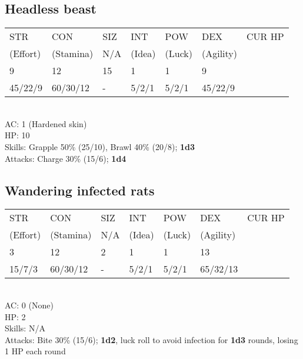 \documentclass[12pt,a4paper]{article}
\begin{document}
\subsection*{Headless beast}
\begin{tabular}{| l | l | l | l | l | l |l|}
\hline
STR & CON & SIZ & INT & POW & DEX & CUR HP\\
(Effort) & (Stamina) & N/A & (Idea) & (Luck) & (Agility) & \\
\hline
9       & 12       & 15 & 1     & 1     & 9       & \\
45/22/9 & 60/30/12 & -  & 5/2/1 & 5/2/1 & 45/22/9 & \\ 
\hline
\end{tabular}
\vspace{0.2cm}
\\
AC: 1 (Hardened skin)\\
HP: 10\\
Skills: Grapple 50\% (25/10), Brawl 40\% (20/8); \textbf{1d3}\\
Attacks: Charge 30\% (15/6); \textbf{1d4}
\subsection*{Wandering infected rats}
\begin{tabular}{| l | l | l | l | l | l |l|}
\hline
STR & CON & SIZ & INT & POW & DEX & CUR HP\\
(Effort) & (Stamina) & N/A & (Idea) & (Luck) & (Agility) & \\
\hline
3       & 12       & 2  & 1     & 1     & 13       & \\
15/7/3  & 60/30/12 & -  & 5/2/1 & 5/2/1 & 65/32/13 & \\ 
\hline
\end{tabular}
\vspace{0.2cm}
\\
AC: 0 (None)\\
HP: 2\\
Skills: N/A\\
Attacks: Bite 30\% (15/6); \textbf{1d2}, luck roll to avoid infection for \textbf{1d3} rounds, losing 1 HP each round
\newpage
\end{document}
